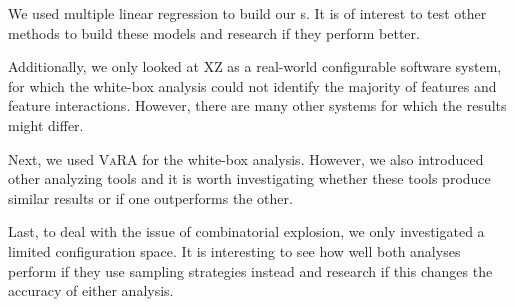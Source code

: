 We used multiple linear regression to build our {\perfInfluenceModel}s. 
It is of interest to test other methods to build these models and research if they perform better. 

Additionally, we only looked at \textsc{XZ} as a real-world configurable software system, 
for which the white-box analysis could not identify the majority of features and feature interactions. 
However, there are many other systems for which the results might differ.

Next, we used \textsc{VaRA} for the white-box analysis. 
However, we also introduced other analyzing tools and it is worth investigating whether these tools produce similar results or if one outperforms the other.

Last, to deal with the issue of combinatorial explosion, we only investigated a limited configuration space. 
It is interesting to see how well both analyses perform if they use sampling strategies instead and 
research if this changes the accuracy of either analysis.